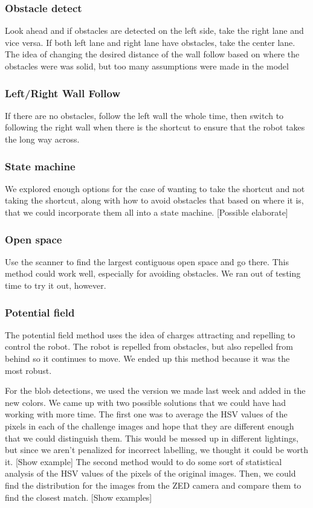 \documentclass[journal, a4paper]{IEEEtran}
\begin{document}
\subsubsection{Obstacle detect}
Look ahead and if obstacles are detected on the left side, take the right lane and vice versa. If both left lane and right lane have obstacles, take the center lane. The idea of changing the desired distance of the wall follow based on where the obstacles were was solid, but too many assumptions were made in the model
\subsubsection{Left/Right Wall Follow}
If there are no obstacles, follow the left wall the whole time, then switch to following the right wall when there is the shortcut to ensure that the robot takes the long way across.
\subsubsection{State machine}
We explored enough options for the case of wanting to take the shortcut and not taking the shortcut, along with how to avoid obstacles that based on where it is, that we could incorporate them all into a state machine. [Possible elaborate]
\subsubsection{Open space}
Use the scanner to find the largest contiguous open space and go there. This method could work well, especially for avoiding obstacles. We ran out of testing time to try it out, however. 
\subsubsection{Potential field}
The potential field method uses the idea of charges attracting and repelling to control the robot. The robot is repelled from obstacles, but also repelled from behind so it continues to move. We ended up this method because it was the most robust.

For the blob detections, we used the version we made last week and added in the new colors. We came up with two possible solutions that we could have had working with more time. The first one was to average the HSV values of the pixels in each of the challenge images and hope that they are different enough that we could distinguish them. This would be messed up in different lightings, but since we aren’t penalized for incorrect labelling, we thought it could be worth it. [Show example] The second method would to do some sort of statistical analysis of the HSV values of the pixels of the original images. Then, we could find the distribution for the images from the ZED camera and compare them to find the closest match. [Show examples]
\end{document}
